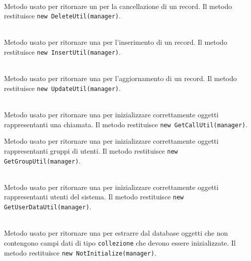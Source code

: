 \begin{description}
	\item{}\\
	Metodo usato per ritornare un  per la cancellazione di un record. Il metodo restituisce \verb|new DeleteUtil(manager)|.
	
	\item{}\\
	Metodo usato per ritornare una  per l'inserimento di un record. Il metodo restituisce \verb|new InsertUtil(manager)|.
	
	\item{}\\
	Metodo usato per ritornare una  per l'aggiornamento di un record. Il metodo restituisce \verb|new UpdateUtil(manager)|.
	
	\item{}\\
	Metodo usato per ritornare una  per inizializzare correttamente oggetti rappresentanti una chiamata. Il metodo restituisce \verb|new GetCallUtil(manager)|.	
	
	\item{}
		Metodo usato per ritornare una  per inizializzare correttamente oggetti rappresentanti gruppi di utenti. Il metodo restituisce \verb|new GetGroupUtil(manager)|.	
	
	\item{}\\
		Metodo usato per ritornare una  per inizializzare correttamente oggetti rappresentanti utenti del sistema. Il metodo restituisce \verb|new GetUserDataUtil(manager)|.	

	\item{}\\
		Metodo usato per ritornare una  per estrarre dal database oggetti che non contengono campi dati di tipo \texttt{collezione} che devono essere inizializzate. Il metodo restituisce \verb|new NotInitialize(manager)|.	
		
\end{description}		

